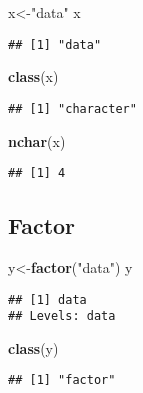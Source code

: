 \documentclass[
]{article}
\newenvironment{Shaded}{\begin{snugshade}}{\end{snugshade}}
\newcommand{\FunctionTok}[1]{\textcolor[rgb]{0.13,0.29,0.53}{\textbf{#1}}}
\newcommand{\NormalTok}[1]{#1}
\newcommand{\OtherTok}[1]{\textcolor[rgb]{0.56,0.35,0.01}{#1}}
\newcommand{\StringTok}[1]{\textcolor[rgb]{0.31,0.60,0.02}{#1}}
\begin{document}
\begin{Shaded}
\begin{Highlighting}[]
\NormalTok{x}\OtherTok{\textless{}{-}}\StringTok{"data"}
\NormalTok{x}
\end{Highlighting}
\end{Shaded}

\begin{verbatim}
## [1] "data"
\end{verbatim}

\begin{Shaded}
\begin{Highlighting}[]
\FunctionTok{class}\NormalTok{(x)}
\end{Highlighting}
\end{Shaded}

\begin{verbatim}
## [1] "character"
\end{verbatim}

\begin{Shaded}
\begin{Highlighting}[]
\FunctionTok{nchar}\NormalTok{(x)}
\end{Highlighting}
\end{Shaded}

\begin{verbatim}
## [1] 4
\end{verbatim}

\subsection{Factor}\label{factor}

\begin{Shaded}
\begin{Highlighting}[]
\NormalTok{y}\OtherTok{\textless{}{-}}\FunctionTok{factor}\NormalTok{(}\StringTok{"data"}\NormalTok{)}
\NormalTok{y}
\end{Highlighting}
\end{Shaded}

\begin{verbatim}
## [1] data
## Levels: data
\end{verbatim}

\begin{Shaded}
\begin{Highlighting}[]
\FunctionTok{class}\NormalTok{(y)}
\end{Highlighting}
\end{Shaded}

\begin{verbatim}
## [1] "factor"
\end{verbatim}
\end{document}
